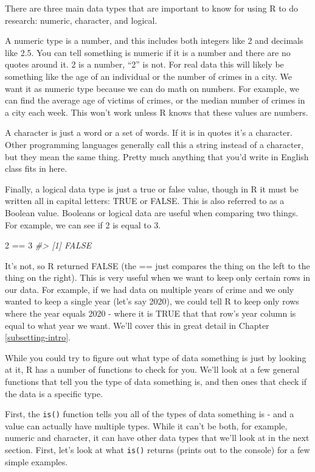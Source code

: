 \documentclass[
]{krantz}
\makeatletter
\newenvironment{Shaded}{\begin{snugshade}}{\end{snugshade}}
\newcommand{\CommentTok}[1]{\textcolor[rgb]{0.37,0.37,0.37}{\textit{#1}}}
\newcommand{\DecValTok}[1]{\textcolor[rgb]{0.06,0.06,0.06}{#1}}
\newcommand{\SpecialCharTok}[1]{\textcolor[rgb]{0,0,0}{#1}}
\newenvironment{kframe}{%
\medskip{}
\setlength{\fboxsep}{.8em}
 \def\at@end@of@kframe{}%
 \ifinner\ifhmode%
  \def\at@end@of@kframe{\end{minipage}}%
  \begin{minipage}{\columnwidth}%
 \fi\fi%
 \def\FrameCommand##1{\hskip\@totalleftmargin \hskip-\fboxsep
 \colorbox{shadecolor}{##1}\hskip-\fboxsep
     \hskip-\linewidth \hskip-\@totalleftmargin \hskip\columnwidth}%
 \MakeFramed {\advance\hsize-\width
   \@totalleftmargin\z@ \linewidth\hsize
   \@setminipage}}%
 {\par\unskip\endMakeFramed%
 \at@end@of@kframe}
\renewenvironment{Shaded}{\begin{kframe}}{\end{kframe}}
\makeatother
\begin{document}
There are three main data types that are important to know
for using R to do research: numeric, character, and logical.

A numeric type is a number, and this includes both integers
like 2 and decimals like 2.5. You can tell something is
numeric if it is a number and there are no quotes around it.
2 is a number, ``2'' is not. For real data this will likely
be something like the age of an individual or the number of
crimes in a city. We want it as numeric type because we can
do math on numbers. For example, we can find the average age
of victims of crimes, or the median number of crimes in a
city each week. This won't work unless R knows that these
values are numbers.

A character is just a word or a set of words. If it is in
quotes it's a character. Other programming languages
generally call this a string instead of a character, but
they mean the same thing. Pretty much anything that you'd
write in English class fits in here.

Finally, a logical data type is just a true or false value,
though in R it must be written all in capital letters: TRUE
or FALSE. This is also referred to as a Boolean value.
Booleans or logical data are useful when comparing two
things. For example, we can see if 2 is equal to 3.

\begin{Shaded}
\begin{Highlighting}[]
\DecValTok{2} \SpecialCharTok{==} \DecValTok{3}
\CommentTok{\#\textgreater{} [1] FALSE}
\end{Highlighting}
\end{Shaded}

It's not, so R returned FALSE (the == just compares the
thing on the left to the thing on the right). This is very
useful when we want to keep only certain rows in our data.
For example, if we had data on multiple years of crime and
we only wanted to keep a single year (let's say 2020), we
could tell R to keep only rows where the year equals 2020 -
where it is TRUE that that row's year column is equal to
what year we want. We'll cover this in great detail in
Chapter \ref{subsetting-intro}.

While you could try to figure out what type of data
something is just by looking at it, R has a number of
functions to check for you. We'll look at a few general
functions that tell you the type of data something is, and
then ones that check if the data is a specific type.

First, the \texttt{is()} function tells you all of the types
of data something is - and a value can actually have
multiple types. While it can't be both, for example, numeric
and character, it can have other data types that we'll look
at in the next section. First, let's look at what
\texttt{is()} returns (prints out to the console) for a few
simple examples.
\end{document}
